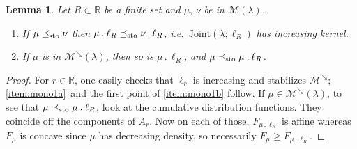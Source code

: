 \documentclass[10pt,a4paper]{article}
\providecommand{\ie}{i.e.\ }
\newcommand{\ldot}{\mathbin{.}}
\theoremstyle{plain}
\newtheorem{lem}[them]{Lemma}
\theoremstyle{definition}
\newcommand{\join}{\mathrm{Joint}}
\newcommand{\la}{\lambda}
\newcommand{\m}{\mathcal{M}}
\newcommand{\R}{\mathbb{R}}
\newcommand{\leqs}{\preceq_{\text{\rm sto}}}
\newcommand{\mdec}{\mathcal{M}^{\scriptscriptstyle\searrow}}
\begin{document}
\begin{lem}\label{lem:mono1}
Let $R\subset \R$ be a finite set and $\mu,\,\nu$ be in $\m(\la)$.

\begin{enumerate}
\item
\label{item:mono1a} If $\mu\leqs \nu$ then $\mu \ldot\ell_R\leqs \nu\ldot\ell_R$, \ie $\join(\la; \ell_R)$ has increasing kernel.
\item
\label{item:mono1b} If $\mu$ is in $\mdec(\la)$, then so is $\mu \ldot\ell_R$, and $\mu\leqs \mu\ldot\ell_R$.
\end{enumerate}
\end{lem}

\begin{proof} For $r\in \R$, one easily checks that $\ell_r$ is increasing and stabilizes $\mdec$; \eqref{item:mono1a}~and the first point of \eqref{item:mono1b} follow. If $\mu\in \mdec(\la)$, to see that $\mu\leqs \mu\ldot\ell_R$, look at the cumulative distribution functions. They coincide off the components of $A_r$. Now on each of those, $F_{\mu\ldot\ell_R}$ is affine whereas $F_\mu$ is concave since $\mu$ has decreasing density, so necessarily $F_\mu\geqslant F_{\mu\ldot\ell_R}$.
\end{proof}
\end{document}
